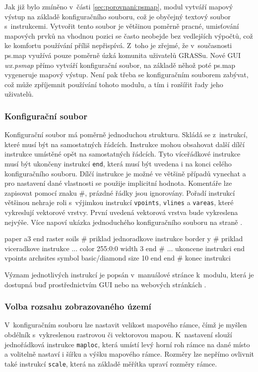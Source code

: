 \documentclass[a4paper,12pt,draft]{article}
\newcommand{\instr}[1]{\lstinline[style=psmapInline]|#1|}
\begin{document}
Jak již bylo zmíněno v~části \ref{sec:porovnani:psmap}, modul
vytváří
mapový výstup na základě konfiguračního souboru, což je oby\-čejný
textový soubor s~instrukcemi. Vytvořit tento soubor je většinou poměrně
pracné, umisťování mapových prvků na vhodnou pozici se často neobejde
bez vedlejších výpočtů, což ke komfortu používání příliš
nepřispívá. Z~toho je zřejmé, že v~součas\-nosti ps.map využívá
pouze poměrně úzká komunita uživatelů GRASSu. Nové GUI
\emph{wx.psmap} přímo vytváří konfigurační soubor, na základě
něhož poté ps.map vygeneruje mapový výstup. Není pak třeba
se konfiguračním souborem zabývat, což může zpříjemnit používání
tohoto modulu, a tím i rozšířit řady jeho uživatelů.

\subsubsection{Konfigurační soubor}
Konfigurační soubor má poměrně jednoduchou strukturu. Skládá se
z~instrukcí, které musí být na samostatných řádcích. Instrukce mohou
obsahovat další dílčí instrukce umístěné opět na samostatných
řádcích. Tyto víceřádkové instrukce musí být ukončeny  instrukcí
\instr{end}, která musí být uvedena i na konci celého konfiguračního
souboru. Dílčí instrukce je možné ve většině případů vynechat a
pro nastavení dané vlastnosti se použije implicitní hodnota. Komentáře
lze zapisovat pomocí znaku \#, prázdné řádky jsou ignorovány. Pořadí
instrukcí většinou nehraje roli s~výjimkou instrukcí \instr{vpoints},
\instr{vlines} a \instr{vareas}, které vykreslují vektorové vrstvy. První
uvedená vektorová vrstva bude vykreslena nejvýše. Více napoví ukázka
jednoduchého konfiguračního souboru na straně \pageref{konfig}.
\begin{psmap}[float=h, title=Příklad jednoduchého konfiguračního souboru,
label=konfig]
paper a3
end
raster soils            # priklad jednoradkove instrukce
border y                # priklad viceradkove instrukce ...
   color 255:0:0
   width 3
end                     # ... ukoncene instrukci end
vpoints archsites
   symbol basic/diamond
   size 10
end
end                     # konec instrukci
\end{psmap}

Význam jednotlivých instrukcí je popsán v~manuálové stránce k~modulu,
která je dostupná buď prostřednictvím GUI nebo na webových stránkách
\cite{manual}.

\subsubsection{Volba rozsahu zobrazovaného území}
\label{sec:psmap:rozsah}
V~konfiguračním souboru lze nastavit velikost mapového rámce, čímž je
myšlen obdélník s~vykreslenou rastrovou či vektorovou mapou.  K~nastavení
slouží jedno\-řádková instrukce \instr{maploc}, která umístí levý
horní roh rámce na dané místo a volitelně nastaví i šířku a
výšku mapového rámce. Rozměry lze nepřímo ovlivnit také instrukcí
\instr{scale}, která na základě měřítka upraví rozměry rámce.
\end{document}
